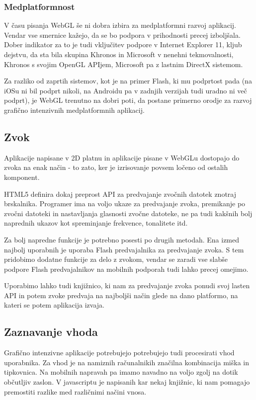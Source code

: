 \subsubsection{Medplatformnost}

V času pisanja WebGL še ni dobra izbira za medplatformni razvoj aplikacij. Vendar vse smernice kažejo, da se bo podpora v prihodnosti precej izboljšala. Dober indikator za to je tudi vključitev podpore v Internet Explorer 11, kljub dejstvu, da sta bila skupina Khronos in Microsoft v nenehni tekmovalnosti, Khronos s svojim OpenGL APIjem, Microsoft pa z lastnim DirectX sistemom.

Za razliko od zaprtih sistemov, kot je na primer Flash, ki mu podprtost pada (na iOSu ni bil podprt nikoli, na Androidu pa v zadnjih verzijah tudi uradno ni več podprt), je WebGL trenutno na dobri poti, da postane primerno orodje za razvoj grafično intenzivnih medplatformnih aplikacij.

\subsection{Zvok}

Aplikacije napisane v 2D platnu in aplikacije pisane v WebGLu dostopajo do zvoka na enak način - to zato, ker je izrisovanje povsem ločeno od ostalih komponent.

HTML5 definira dokaj preprost API za predvajanje zvočnih datotek znotraj brskalnika. Programer ima na voljo ukaze za predvajanje zvoka, premikanje po zvočni datoteki in nastavljanja glasnosti zvočne datoteke, ne pa tudi kakšnih bolj naprednih ukazov kot spreminjanje frekvence, tonalitete itd.

Za bolj napredne funkcije je potrebno posesti po drugih metodah. Ena izmed najbolj uporabnih je uporaba Flash predvajalnika za predvajanje zvoka. S tem pridobimo dodatne funkcije za delo z zvokom, vendar se zaradi vse slabše podpore Flash predvajalnikov na mobilnih podporah tudi lahko precej omejimo. 

Uporabimo lahko tudi knjižnico, ki nam za predvajanje zvoka ponudi svoj lasten API in potem zvoke predvaja na najboljši način glede na dano platformo, na kateri se potem aplikacija izvaja.

\subsection{Zaznavanje vhoda}

Grafično intenzivne aplikacije potrebujejo potrebujejo tudi procesirati vhod uporabnika. Za vhod je na namiznih računalnikih značilna kombinacija miška in tipkovnica. Na mobilnih napravah pa imamo navadno na voljo zgolj na dotik občutljiv zaslon. V javascriptu je napisanih kar nekaj knjižnic, ki nam pomagajo premostiti razlike med različnimi načini vnosa.

